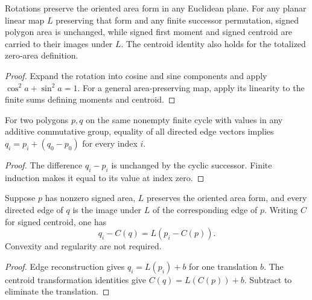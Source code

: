 \begin{lemma}
\label{lem:polygon-map-moments}
\leanok
{}
Rotations preserve the oriented area form in any Euclidean plane.
For any planar linear map $L$ preserving that form and any finite
successor permutation, signed polygon area is unchanged, while signed
first moment and signed centroid are carried to their images under $L$.
The centroid identity also holds for the totalized zero-area definition.
\end{lemma}
\begin{proof}
\leanok
Expand the rotation into cosine and sine components and apply
$\cos^2 a+\sin^2 a=1$. For a general area-preserving map, apply its
linearity to the finite sums defining moments and centroid.
\end{proof}

\begin{lemma}
\label{lem:cyclic-edge-reconstruction}
\leanok
{}
For two polygons $p,q$ on the same nonempty finite cycle with values
in any additive commutative group, equality of all directed edge vectors
implies $q_i=p_i+(q_0-p_0)$ for every index $i$.
\end{lemma}
\begin{proof}
\leanok
The difference $q_i-p_i$ is unchanged by the cyclic successor.
Finite induction makes it equal to its value at index zero.
\end{proof}

\begin{proposition}
\label{prop:centered-edge-reconstruction}
\leanok
{}
Suppose $p$ has nonzero signed area, $L$ preserves the oriented area
form, and every directed edge of $q$ is the image under $L$ of the
corresponding edge of $p$. Writing $C$ for signed centroid, one has
\[
 q_i-C(q)=L(p_i-C(p)).
\]
Convexity and regularity are not required.
\end{proposition}
\begin{proof}
\leanok
Edge reconstruction gives $q_i=L(p_i)+b$ for one translation $b$.
The centroid transformation identities give $C(q)=L(C(p))+b$.
Subtract to eliminate the translation.
\end{proof}

